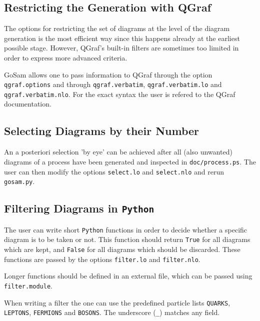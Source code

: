 \documentclass[11pt,a4paper]{refrep}
\newcommand{\gosamversion}{{2{.}0}}
\newcommand{\gosamv}[1][\gosamversion]{{\sc GoSam}\xspace}
\newcommand{\python}{{\tt Python}\xspace}
\begin{document}
\subsection{Restricting the Generation with QGraf}
The options for restricting the set of diagrams at the level
of the diagram generation is the most efficient way since this
happens already at the earliest possible stage.
However, QGraf's built-in filters are sometimes
too limited in order to express more advanced criteria.

\gosamv{} allows one to pass information to QGraf through the option
\texttt{qgraf.options} and through \texttt{qgraf.verbatim},
\texttt{qgraf.verbatim.lo} and \texttt{qgraf.verbatim.nlo}.
For the exact syntax the user is refered to the QGraf documentation.

\subsection{Selecting Diagrams by their Number}
An a posteriori selection 'by eye' can be achieved after all (also unwanted)
diagrams of a process have been generated and inspected in
\texttt{doc/process.ps}. The user can then modify the options
\texttt{select.lo} and \texttt{select.nlo} and rerun \texttt{gosam.py}.


\subsection{Filtering Diagrams in \python{}}
The user can write short \python{} functions in order to decide whether
a specific diagram is to be taken or not. This function should return
\texttt{True} for all diagrams which are kept, and \texttt{False} for
all diagrams which should be discarded. These functions are passed by
the options \texttt{filter.lo} and \texttt{filter.nlo}.

Longer functions should be defined in an external file, which can be
passed using \texttt{filter.module}.

When writing a filter the one can use the predefined particle lists
\texttt{QUARKS}, \texttt{LEPTONS}, \texttt{FERMIONS} and \texttt{BOSONS}.
The underscore (\texttt{\_}) matches any field.
\end{document}
